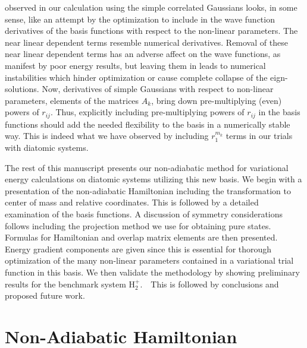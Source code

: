 \documentclass[12pt]{article}
\begin{document}
observed in our calculation using the simple correlated Gaussians looks, in
some sense, like an attempt by the optimization to include in the wave
function derivatives of the basis functions with respect to the non-linear
parameters. The near linear dependent terms resemble numerical derivatives.
Removal of these near linear dependent terms has an adverse affect on the wave
functions, as manifest by poor energy results, but leaving them in leads to
numerical instabilities which hinder optimization or cause complete collapse
of the eign-solutions. Now, derivatives of simple Gaussians with respect to
non-linear parameters, elements of the matrices $A_{k}$, bring down
pre-multiplying (even) powers of $r_{ij}$. Thus, explicitly including
pre-multiplying powers of $r_{ij}$ in the basis functions should add the
needed flexibility to the basis in a numerically stable way. This is indeed
what we have observed by including $r_{1}^{m_{k}}$ terms in our trials with
diatomic systems.

The rest of this manuscript presents our non-adiabatic method for variational
energy calculations on diatomic systems utilizing this new basis. We begin
with a presentation of the non-adiabatic Hamiltonian including the
transformation to center of mass and relative coordinates. This is followed by
a detailed examination of the basis functions. A discussion of symmetry
considerations follows including the projection method we use for obtaining
pure states. Formulas for Hamiltonian and overlap matrix elements are then
presented. Energy gradient components are given since this is essential for
thorough optimization of the many non-linear parameters contained in a
variational trial function in this basis. We then validate the methodology by
showing preliminary results for the benchmark system H$_{2}^{+}.$\ \ This is
followed by conclusions and proposed future work.      

\section{Non-Adiabatic Hamiltonian}
\end{document}
